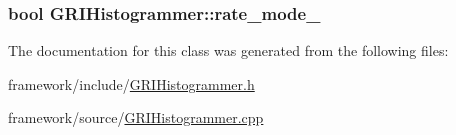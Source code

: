 \hypertarget{classGRIHistogrammer_a49b765d037e31ac24d9f2215d4c336a0}{
\subsubsection[{rate\-\_\-mode\-\_\-}]{\setlength{\rightskip}{0pt plus 5cm}bool {\bf \-G\-R\-I\-Histogrammer\-::rate\-\_\-mode\-\_\-}}}\label{classGRIHistogrammer_a49b765d037e31ac24d9f2215d4c336a0}


\-The documentation for this class was generated from the following files\-:\begin{DoxyCompactItemize}
\item 
framework/include/\hyperlink{GRIHistogrammer_8h}{\-G\-R\-I\-Histogrammer.\-h}\item 
framework/source/\hyperlink{GRIHistogrammer_8cpp}{\-G\-R\-I\-Histogrammer.\-cpp}\end{DoxyCompactItemize}
